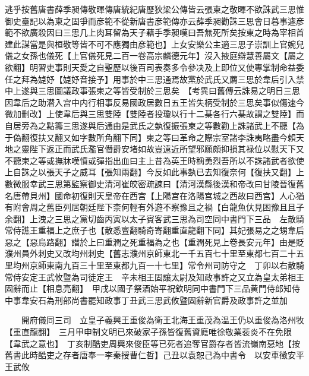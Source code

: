 逃乎按舊唐書薛季昶傳敬暉傳唐統紀唐歷狄梁公傳皆云張柬之敬暉不欲誅武三思惟御史臺記以為柬之固爭而彦範不從新唐書彦範傳亦云薛季昶勸誅三思會日暮事遽彦範不欲廣殺因曰三思几上肉耳留為天子藉手季昶嘆曰吾無死所矣按東之時為宰相首建此謀當是與桓敬等皆不可不應獨由彦範也】上女安樂公主適三思子崇訓上官婉兒儀之女孫也儀死【上官儀死見二百一卷高宗麟德元年】沒入掖庭辯慧善屬文【屬之欲翻】明習吏事則天愛之自聖歷以後百司表奏多令參决及上即位又使專掌制命益委任之拜為媫妤【媫妤音接予】用事於中三思通焉故黨於武氏又薦三思於韋后引入禁中上遂與三思圖議政事張柬之等皆受制於三思矣　【考異曰舊傳云誅易之明日三思因韋后之助潜入宫中内行相事反易國政居數日五王皆失柄受制於三思矣事似傷速今微加刪改】上使韋后與三思雙陸【雙陸者投瓊以行十二棊各行六棊故謂之雙陸】而自居旁為之點籌三思遂與后通由是武氏之埶復振張柬之等數勸上誅諸武上不聽【為于偽翻復扶又翻又如字數所角翻下同】柬之等曰革命之際宗室諸李誅夷略盡今賴天地之靈陛下返正而武氏濫官僭爵安堵如故豈遠近所望邪願頗抑損其禄位以慰天下又不聽柬之等或撫牀嘆憤或彈指出血曰主上昔為英王時稱勇烈吾所以不誅諸武者欲使上自誅之以張天子之威耳【張知兩翻】今反如此事埶已去知復奈何【復扶又翻】上數微服幸武三思第監察御史清河崔皎密疏諫曰【清河漢縣後漢和帝改曰甘陵晉復舊名唐帶貝州】國命初復則天皇帝在西宫【上陽宫在洛陽宫城之西故曰西宫】人心猶有附會周之舊臣列居朝廷陛下柰何輕有外遊不察豫且之禍【白龍魚㐲見困豫且且子余翻】上洩之三思之黨切齒丙寅以太子賓客武三思為司空同中書門下三品　左散騎常侍譙王重福上之庶子也【散悉亶翻騎奇寄翻重直龍翻下同】其妃張易之之甥韋后惡之【惡烏路翻】譛於上曰重潤之死重福為之也【重潤死見上卷長安元年】由是貶濮州員外刺史又改均州刺史【舊志濮州京師東北一千五百七十里至東都七百二十五里均州京師東南九百三十里至東都九百一十七里】常令州司防守之　丁卯以右散騎常侍安定王武攸暨為司徒定王　辛未相王固讓太尉及知政事許之又立為皇太弟相王固辭而止【相息亮翻】　甲戌以國子祭酒始平祝欽明同中書門下三品黄門侍郎知侍中事韋安石為刑部尚書罷知政事丁丑武三思武攸暨固辭新官爵及政事許之並加

　　開府儀同三司　立皇子義興王重俊為衛王北海王重茂為温王仍以重俊為洛州牧【重直龍翻】　三月甲申制文明已來破家子孫皆復舊資廕唯徐敬業裴炎不在免限【韋武之意也】　丁亥制酷吏周興來俊臣等已死者追奪官爵存者皆流嶺南惡地【按舊書此時酷吏之存者唐奉一李秦授曹仁哲】己丑以袁恕己為中書令　以安車徵安平王武攸

